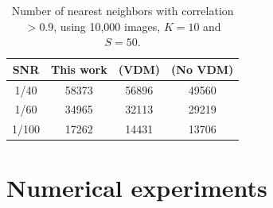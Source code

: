 \begin{table}[]
\centering
\begin{tabular}{|c|c|c|c|}
       \hline       
SNR   & This work        & \cite{zhao} (VDM)        & \cite{zhao} (No VDM)                  \\ \hline
1/40 &  58373         & 56896          & 49560       \\
1/60  & 34965          & 32113          & 29219       \\
1/100 & 17262      & 14431           & 13706         \\
\hline
\end{tabular}
\caption{Number of nearest neighbors with correlation $>0.9$, 
using 10,000 images, $K=10$ and $S=50$.
\label{table:tab}}
\end{table}

\section{Numerical experiments}
\label{sec:num}

